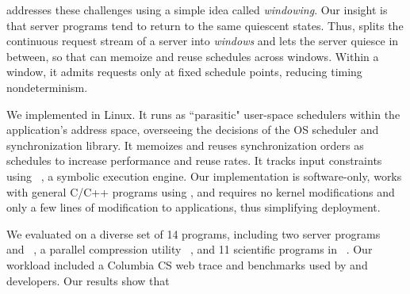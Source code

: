 \tern addresses these challenges using a simple idea called
\emph{windowing}.  Our insight is that server programs tend to return to the
same quiescent states. Thus, \tern splits the continuous request stream of a
server into \emph{windows} and lets the server quiesce in between, so that \tern
can memoize and reuse schedules across windows.  Within a window, it admits
requests only at fixed schedule points, reducing timing nondeterminism.



We implemented \tern in Linux.  It runs as ``parasitic"
user-space schedulers within the application's address space, overseeing
the decisions of the OS scheduler and synchronization library.  It
memoizes and reuses synchronization orders as schedules to increase
performance and reuse rates. It tracks input constraints using
\klee~\cite{klee:osdi08}, a symbolic execution engine.  Our implementation
is software-only, works with general C/C++ programs using \pthread, and
requires no kernel modifications and only a few lines of modification to
applications, thus simplifying deployment.

We evaluated \tern on a diverse set of 14 programs, including two server
programs \apache~\cite{apache} and \mysql~\cite{mysql}, a parallel
compression utility \pbzip~\cite{pbzip2}, and 11 scientific programs in
\splash~\cite{splash2}.  Our workload included a Columbia CS web trace and
benchmarks used by \apache and \mysql developers.  Our results show that


